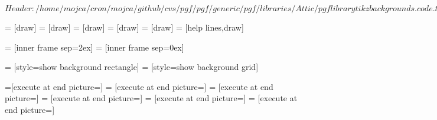 \ProvidesFileRCS[v\pgfversion] $Header: /home/mojca/cron/mojca/github/cvs/pgf/pgf/generic/pgf/libraries/Attic/pgflibrarytikzbackgrounds.code.tex,v 1.2 2006/10/11 10:03:03 tantau Exp $

%






= [draw]
=       [draw]
=    [draw]
=      [draw]
=     [draw]
=      [help lines,draw]

\def\tikz@framexsep{1ex}
\def\tikz@frameysep{1ex}

\def\tikz@outerframexsep{0ex}
\def\tikz@outerframeysep{0ex}



=     [inner frame sep=2ex]
=     [inner frame sep=0ex]




=                   [style=show background rectangle]
=                  [style=show background grid]

=[execute at end picture=\tikz@background@framed]
=      [execute at end picture=\tikz@background@top]
=   [execute at end picture=\tikz@background@bottom]
=     [execute at end picture=\tikz@background@left]
=    [execute at end picture=\tikz@background@right]
=     [execute at end picture=\tikz@background@grid]


